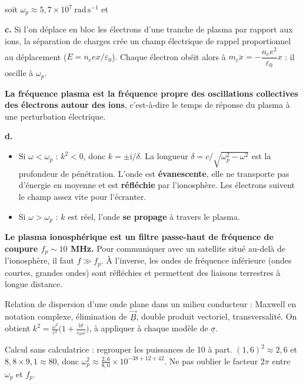 \documentclass[11pt,a4paper]{article}
\providecommand{\tightlist}{\setlength{\itemsep}{0pt}\setlength{\parskip}{0pt}}
\newcommand{\equationajustee}[1]{%
  \sbox{\boiteequation}{$\displaystyle #1$}%
  \ifdim\wd\boiteequation>\linewidth
    \[\resizebox{\linewidth}{!}{\usebox{\boiteequation}}\]%
  \else
    \[#1\]%
  \fi}
\begin{document}
soit \(\omega_p\approx5{,}7\times10^{7}\ \mathrm{rad\,s^{-1}}\) et

\equationajustee{\boxed{f_p=\frac{\omega_p}{2\pi}\sim1\times10^{7}\ \mathrm{Hz}\ (\approx 9\ \mathrm{MHz})}}

\textbf{c.} Si l'on déplace en bloc les électrons d'une tranche de plasma par rapport aux ions, la séparation de charges crée un champ électrique de rappel proportionnel au déplacement (\(E=n_e e x/\varepsilon_0\)). Chaque électron obéit alors à \(m_e\ddot x=-\dfrac{n_e e^2}{\varepsilon_0}x\) : il oscille à \(\omega_p\).

\textbf{La fréquence plasma est la fréquence propre des oscillations collectives des électrons autour des ions}, c'est-à-dire le temps de réponse du plasma à une perturbation électrique.

\textbf{d.}

\begin{itemize}
\tightlist
\item
  Si \(\omega<\omega_p\) : \(k^2<0\), donc \(k=\pm\mathrm i/\delta\). La longueur \(\delta=c/\sqrt{\omega_p^2-\omega^2}\) est la profondeur de pénétration. L'onde est \textbf{évanescente}, elle ne transporte pas d'énergie en moyenne et est \textbf{réfléchie} par l'ionosphère. Les électrons suivent le champ assez vite pour l'écranter.
\item
  Si \(\omega>\omega_p\) : \(k\) est réel, l'onde \textbf{se propage} à travers le plasma.
\end{itemize}

\textbf{Le plasma ionosphérique est un filtre passe-haut de fréquence de coupure \(f_p\sim10\) MHz.} Pour communiquer avec un satellite situé au-delà de l'ionosphère, il faut \(f\gg f_p\). À l'inverse, les ondes de fréquence inférieure (ondes courtes, grandes ondes) sont réfléchies et permettent des liaisons terrestres à longue distance.

\begin{methode}

Relation de dispersion d'une onde plane dans un milieu conducteur : Maxwell en notation complexe, élimination de \(\underline{\vec B}\), double produit vectoriel, transversalité. On obtient \(k^2=\frac{\omega^2}{c^2}\big(1+\frac{\mathrm i\underline\sigma}{\varepsilon_0\omega}\big)\), à appliquer à chaque modèle de \(\underline\sigma\).

\end{methode}

\begin{piege}

Calcul sans calculatrice : regrouper les puissances de 10 à part. \((1{,}6)^2\approx2{,}6\) et \(8{,}8\times9{,}1\approx80\), donc \(\omega_p^2\approx\frac{2{,}6}{8{,}0}\times10^{-38+12+42}\). Ne pas oublier le facteur \(2\pi\) entre \(\omega_p\) et \(f_p\).

\end{piege}
\end{document}
